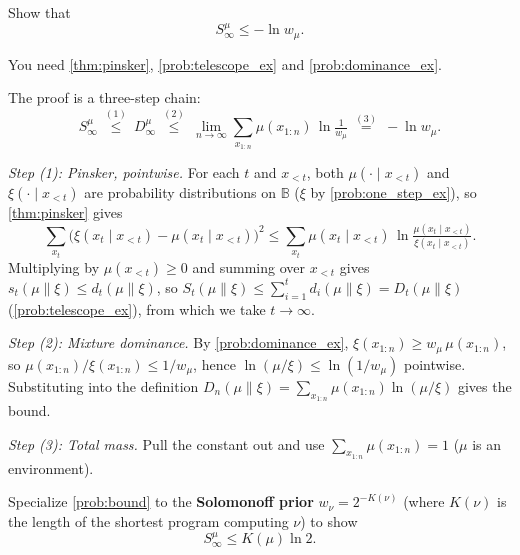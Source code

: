 \documentclass[fontsize=11pt, parskip=half]{scrartcl}
\begin{document}
\begin{exercise}
\label{prob:bound_ex}



Show that
\[
S_{\infty}^{\mu} \leq - \ln w_\mu.
\]

\begin{hint}
You need \cref{thm:pinsker}, \cref{prob:telescope_ex} and \cref{prob:dominance_ex}.
\end{hint}
\end{exercise}

\begin{solution}
The proof is a three-step chain:
\[
  S^\mu_\infty
  ~\stackrel{(1)}{\leq}~
   D^\mu_\infty
  ~\stackrel{(2)}{\leq}~
  \lim_{n \to \infty} \sum_{x_{1:n}} \mu(x_{1:n}) \,\ln \tfrac{1}{w_\mu}
  ~\stackrel{(3)}{=}~
  -\ln w_\mu.
\]

\medskip
\textit{Step (1): Pinsker, pointwise.}
For each $t$ and $x_{<t}$, both $\mu(\cdot \mid x_{<t})$ and $\xi(\cdot \mid x_{<t})$ are probability distributions on $\mathbb{B}$ ($\xi$ by \cref{prob:one_step_ex}), so \cref{thm:pinsker} gives
\[
\sum_{x_t} \bigl(\xi(x_t \mid x_{<t}) - \mu(x_t \mid x_{<t})\bigr)^2 \leq \sum_{x_t} \mu(x_t \mid x_{<t}) \,\ln \tfrac{\mu(x_t \mid x_{<t})}{\xi(x_t \mid x_{<t})}.
\]
Multiplying by $\mu(x_{<t}) \geq 0$ and summing over $x_{<t}$ gives 
$s_t(\mu \parallel \xi) \leq d_t(\mu \parallel \xi)$, so $S_t(\mu \parallel \xi) \leq \sum_{i=1}^t d_i(\mu \parallel \xi) = D_t(\mu \parallel \xi)$ (\cref{prob:telescope_ex}), 
from which we take $t \to \infty$.


\medskip
\textit{Step (2): Mixture dominance.}
By \cref{prob:dominance_ex}, $\xi(x_{1:n}) \geq w_\mu\, \mu(x_{1:n})$, so $\mu(x_{1:n}) / \xi(x_{1:n}) \leq 1/w_\mu$, hence $\ln(\mu/\xi) \leq \ln(1/w_\mu)$ pointwise. Substituting into the definition $D_n(\mu \parallel \xi) = \sum_{x_{1:n}} \mu(x_{1:n}) \ln(\mu/\xi)$ gives the bound.

\medskip
\textit{Step (3): Total mass.}
Pull the constant out and use $\sum_{x_{1:n}} \mu(x_{1:n}) = 1$ ($\mu$ is an environment). \qedhere
\end{solution}


\begin{exercise}
\label{prob:bound_explicit_ex}



Specialize \cref{prob:bound} to the \textbf{Solomonoff prior} $w_\nu = 2^{-K(\nu)}$ (where $K(\nu)$ is the length of the shortest program computing $\nu$) to show
\[
S_{\infty}^{\mu} \leq K(\mu) \ln 2.
\]
\end{exercise}
\end{document}
